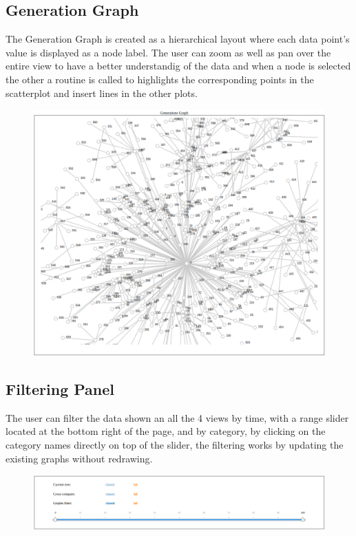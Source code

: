 \documentclass[conference,compsoc]{IEEEtran}
\begin{document}
\subsection{Generation Graph}
The Generation Graph is created as a hierarchical layout where each data point's value is displayed as a node label. The user can zoom as well as pan over the entire view to have a better understandig of the data and when a node is selected the other a routine is called to highlights the corresponding points in the scatterplot and insert lines in the other plots.
\begin{figure}[H]
  \includegraphics[scale=0.2]{img/tree}
  \label{fig:tree}
\end{figure}

\subsection{Filtering Panel}
The user can filter the data shown an all the 4 views by time, with a range slider located at the bottom right of the page, and by category, by clicking on the category names directly on top of the slider, the filtering works by updating the existing graphs without redrawing.
\begin{figure}[H]
  \includegraphics[scale=0.2]{img/panel}
  \label{fig:panel}
\end{figure}
\end{document}
